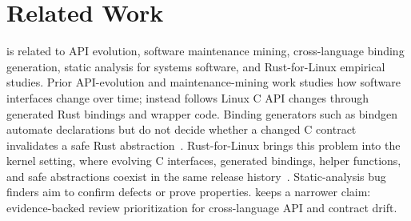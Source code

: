 \section{Related Work}

\tool{} is related to API evolution, software maintenance mining,
cross-language binding generation, static analysis for systems software, and
Rust-for-Linux empirical studies. Prior API-evolution and maintenance-mining
work studies how software interfaces change over time; \tool{} instead follows
Linux C API changes through generated Rust bindings and wrapper code. Binding
generators such as bindgen automate declarations but do not decide whether a
changed C contract invalidates a safe Rust abstraction~\cite{bindgen}.
Rust-for-Linux brings this problem into the kernel setting, where evolving C
interfaces, generated bindings, helper functions, and safe abstractions coexist
in the same release history~\cite{rust-for-linux,linux-kernel}. Static-analysis
bug finders aim to confirm defects or prove properties. \tool{} keeps a narrower
claim: evidence-backed review prioritization for cross-language API and
contract drift.
